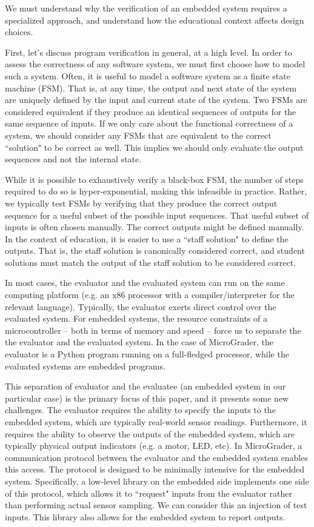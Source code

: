 \documentclass[12pt]{article}
\begin{document}
We must understand why the verification of an embedded system requires a specialized approach, and understand how the educational context affects design choices.

First, let's discuss program verification in general, at a high level. In order to assess the correctness of any software system, we must first choose how to model such a system.  Often, it is useful to model a software system as a finite state machine (FSM).  That is, at any time, the output and next state of the system are uniquely defined by the input and current state of the system.  Two FSMs are considered equivalent if they produce an identical sequences of outputs for the same sequence of inputs.  If we only care about the functional correctness of a system, we should consider any FSMs that are equivalent to the correct ``solution" to be correct as well.  This implies we should only evaluate the output sequences and not the internal state.

While it is possible to exhaustively verify a black-box FSM, the number of steps required to do so is hyper-exponential, making this infeasible in practice.  Rather, we typically test FSMs by verifying that they produce the correct output sequence for a useful subset of the possible input sequences.  That useful subset of inputs is often chosen manually.  The correct outputs might be defined manually.  In the context of education, it is easier to use a ``staff solution" to define the outputs.  That is, the staff solution is canonically considered correct, and student solutions must match the output of the staff solution to be considered correct.
   
In most cases, the evaluator and the evaluated system can run on the same computing platform (e.g. an x86 processor with a compiler/interpreter for the relevant language).  Typically, the evaluator exerts direct control over the evaluated system.  For embedded systems, the resource constraints of a microcontroller -- both in terms of memory and speed -- force us to separate the the evaluator and the evaluated system.  In the case of MicroGrader, the evaluator is a Python program running on a full-fledged processor, while the evaluated systems are embedded programs.

This separation of evaluator and the evaluatee (an embedded system in our particular case) is the primary focus of this paper, and it presents some new challenges.  The evaluator requires the ability to specify the inputs to the embedded system, which are typically real-world sensor readings.  Furthermore, it requires the ability to observe the outputs of the embedded system, which are typically physical output indicators (e.g. a motor, LED, etc).  In MicroGrader, a communication protocol between the evaluator and the embedded system enables this access.  The protocol is designed to be minimally intensive for the embedded system.  Specifically, a low-level library on the embedded side implements one side of this protocol, which allows it to ``request" inputs from the evaluator rather than performing actual sensor sampling.  We can consider this an injection of test inputs.  This library also allows for the embedded system to report outputs.
\end{document}
